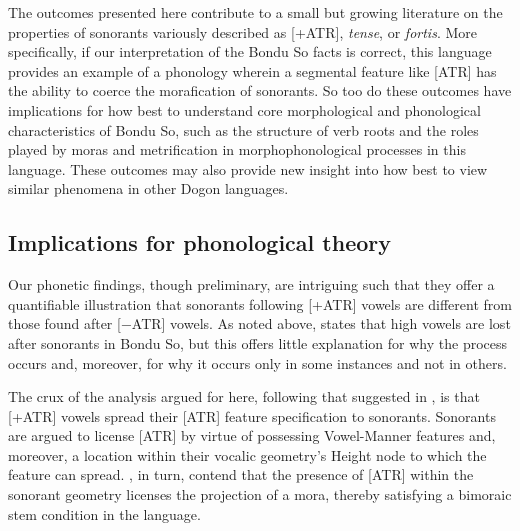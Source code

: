 \documentclass[output=paper,colorlinks,citecolor=brown]{langscibook}
\begin{document}
The outcomes presented here contribute to a small but growing literature on the properties of sonorants variously described as [+ATR], \textit{tense}, or \textit{fortis}. More specifically, if our interpretation of the Bondu So facts is correct, this language provides an example of a phonology wherein a segmental feature like [ATR] has the ability to coerce  the morafication of sonorants. So too do these outcomes have implications for how best to understand core morphological and phonological characteristics of Bondu So, such as the structure of verb roots and the roles played by moras and metrification in morphophonological processes in this language. These outcomes may also provide new insight into how best to view similar phenomena in other Dogon languages. 

\subsection{Implications for phonological theory}
\label{subsec-imp}

Our phonetic findings, though preliminary, are intriguing such that they offer a quantifiable illustration that sonorants following [+ATR] vowels are different from those found after [−ATR] vowels. As noted above, \citet{HeathBS2017} states that high vowels are lost after sonorants in Bondu So, but this offers little explanation for why the process occurs and, moreover, for why it occurs only in some instances and not in others. 

The crux of the analysis argued for here, following that suggested in \citet{GreenHantgan}, is that [+ATR] vowels spread their [ATR] feature specification to sonorants. Sonorants are argued to license [ATR] by virtue of possessing Vowel-Manner features and, moreover, a location within their  vocalic geometry's Height node to which the feature can spread. \citet{GreenHantgan}, in turn, contend that the presence of [ATR] within the sonorant geometry licenses the projection of a mora, thereby satisfying a bimoraic stem  condition in the language.
\end{document}
